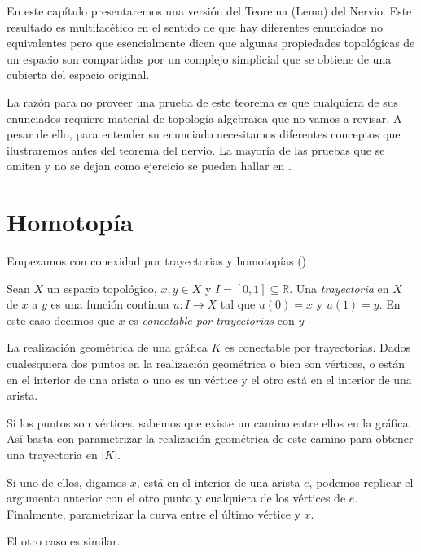\documentclass{standalone}
\begin{document}
	En este capítulo presentaremos una versión del Teorema (Lema) del Nervio. Este resultado es multifacético en el sentido de que hay diferentes enunciados no equivalentes pero que esencialmente dicen que algunas propiedades topológicas de un espacio son compartidas por un complejo simplicial  que se obtiene de una cubierta del espacio original.
	
	La razón para no proveer una prueba de este teorema es que cualquiera de sus enunciados requiere material de topología algebraica que no vamos a revisar. A pesar de ello, para entender su enunciado necesitamos diferentes conceptos que ilustraremos antes del teorema del nervio.  La mayoría de las pruebas que se omiten y no se dejan como ejercicio se pueden hallar en \cite{dieck:2008:algebraic:topology,munkres:1984:algebraic:topology,rotman:1988:algebraic:topology}. 
	
	\section*{Homotopía}
	Empezamos con conexidad por trayectorias y homotopías (\cite[Section 2.1]{dieck:2008:algebraic:topology})
	
	\begin{definition}\label{defn:path}
		Sean $X$ un espacio topológico, $x,y\in X$ y $I=[0,1]\subseteq\mathbb{R}$. Una \emph{trayectoria} en $X$ de $x$ a $y$ es una función continua $u\colon I\rightarrow X$ tal que $u(0)=x$ y $u(1)=y$. En este caso decimos que $x$ es \emph{conectable por trayectorias} con $y$
	\end{definition}
	
	\begin{example}
		La realización geométrica de una gráfica $K$ es conectable por trayectorias. Dados cualesquiera dos puntos en la realización geométrica o bien son vértices, o están en el interior de una arista o uno es un vértice y el otro está en el interior de una arista.
		
		Si los puntos son vértices, sabemos que existe un camino entre ellos en la gráfica. Así basta con parametrizar la realización geométrica de este camino para obtener una trayectoria en $|K|$.
		
		Si uno de ellos, digamos $x$, está en el interior de una arista $e$, podemos replicar el argumento anterior con el otro punto y cualquiera de los vértices de $e$. Finalmente, parametrizar la curva entre el último vértice y $x$.
		
		El otro caso es similar.
	\end{example}
	
\end{document}
